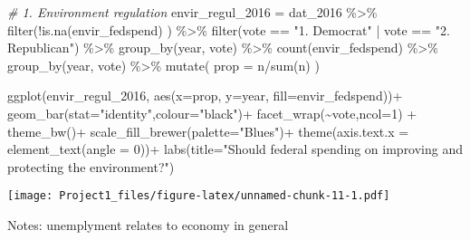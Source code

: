 \documentclass[
]{article}
\newenvironment{Shaded}{\begin{snugshade}}{\end{snugshade}}
\newcommand{\AttributeTok}[1]{\textcolor[rgb]{0.77,0.63,0.00}{#1}}
\newcommand{\CommentTok}[1]{\textcolor[rgb]{0.56,0.35,0.01}{\textit{#1}}}
\newcommand{\DecValTok}[1]{\textcolor[rgb]{0.00,0.00,0.81}{#1}}
\newcommand{\FunctionTok}[1]{\textcolor[rgb]{0.00,0.00,0.00}{#1}}
\newcommand{\NormalTok}[1]{#1}
\newcommand{\OtherTok}[1]{\textcolor[rgb]{0.56,0.35,0.01}{#1}}
\newcommand{\SpecialCharTok}[1]{\textcolor[rgb]{0.00,0.00,0.00}{#1}}
\newcommand{\StringTok}[1]{\textcolor[rgb]{0.31,0.60,0.02}{#1}}
\begin{document}
\begin{Shaded}
\begin{Highlighting}[]
\CommentTok{\# 1. Environment regulation}
\NormalTok{envir\_regul\_2016 }\OtherTok{=}\NormalTok{ dat\_2016 }\SpecialCharTok{\%\textgreater{}\%}
  \FunctionTok{filter}\NormalTok{(}\SpecialCharTok{!}\FunctionTok{is.na}\NormalTok{(envir\_fedspend) ) }\SpecialCharTok{\%\textgreater{}\%}
  \FunctionTok{filter}\NormalTok{(vote }\SpecialCharTok{==} \StringTok{"1. Democrat"} \SpecialCharTok{|}\NormalTok{ vote }\SpecialCharTok{==} \StringTok{"2. Republican"}\NormalTok{) }\SpecialCharTok{\%\textgreater{}\%}
  \FunctionTok{group\_by}\NormalTok{(year, vote) }\SpecialCharTok{\%\textgreater{}\%}
  \FunctionTok{count}\NormalTok{(envir\_fedspend) }\SpecialCharTok{\%\textgreater{}\%}
  \FunctionTok{group\_by}\NormalTok{(year, vote) }\SpecialCharTok{\%\textgreater{}\%}
  \FunctionTok{mutate}\NormalTok{(}
    \AttributeTok{prop =}\NormalTok{ n}\SpecialCharTok{/}\FunctionTok{sum}\NormalTok{(n)}
\NormalTok{  )}

\FunctionTok{ggplot}\NormalTok{(envir\_regul\_2016,}
       \FunctionTok{aes}\NormalTok{(}\AttributeTok{x=}\NormalTok{prop, }\AttributeTok{y=}\NormalTok{year, }\AttributeTok{fill=}\NormalTok{envir\_fedspend))}\SpecialCharTok{+}
  \FunctionTok{geom\_bar}\NormalTok{(}\AttributeTok{stat=}\StringTok{"identity"}\NormalTok{,}\AttributeTok{colour=}\StringTok{"black"}\NormalTok{)}\SpecialCharTok{+}
  \FunctionTok{facet\_wrap}\NormalTok{(}\SpecialCharTok{\textasciitilde{}}\NormalTok{vote,}\AttributeTok{ncol=}\DecValTok{1}\NormalTok{) }\SpecialCharTok{+}
  \FunctionTok{theme\_bw}\NormalTok{()}\SpecialCharTok{+}
  \FunctionTok{scale\_fill\_brewer}\NormalTok{(}\AttributeTok{palette=}\StringTok{"Blues"}\NormalTok{)}\SpecialCharTok{+}
  \FunctionTok{theme}\NormalTok{(}\AttributeTok{axis.text.x =} \FunctionTok{element\_text}\NormalTok{(}\AttributeTok{angle =} \DecValTok{0}\NormalTok{))}\SpecialCharTok{+}
  \FunctionTok{labs}\NormalTok{(}\AttributeTok{title=}\StringTok{"Should federal spending on improving and protecting the environment?"}\NormalTok{)}
\end{Highlighting}
\end{Shaded}

\texttt{[image: Project1\_files/figure-latex/unnamed-chunk-11-1.pdf]}

Notes: unemplyment relates to economy in general
\end{document}
